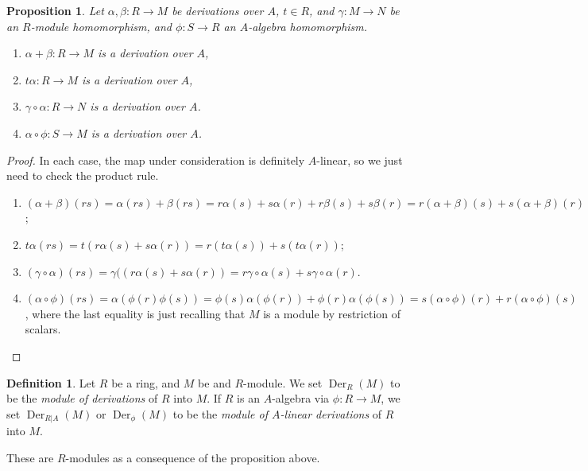 \documentclass{amsart}[12pt]
\def\Der{\operatorname{Der}}
\numberwithin{equation}{section}
\theoremstyle{plain} %
\newtheorem{prop}[equation]{Proposition}
\theoremstyle{definition}
\newtheorem{defn}[equation]{Definition}
\theoremstyle{remark}
\begin{document}
\begin{prop} Let $\alpha,\beta:R\to M$ be derivations over $A$, $t\in R$, and $\gamma:M\to N$ be an $R$-module homomorphism, and $\phi:S\to R$ an $A$-algebra homomorphism.
\begin{enumerate}
\item $\alpha+\beta:R\to M$ is a derivation over $A$,
\item $t\alpha:R\to M$ is a derivation over $A$,
\item $\gamma\circ \alpha:R\to N$ is a derivation over $A$.
\item $\alpha\circ \phi:S\to M$ is a derivation over $A$.
\end{enumerate}
\end{prop}
\begin{proof} In each case, the map under consideration is definitely $A$-linear, so we just need to check the product rule.
\begin{enumerate}
\item $(\alpha+\beta)(rs) =\alpha(rs) + \beta(rs) = r\alpha(s) + s\alpha(r) + r\beta(s)+s\beta(r) =r(\alpha+\beta)(s) + s(\alpha+\beta)(r)$;
\item $t\alpha(rs) = t(r\alpha(s) + s\alpha(r)) = r(t\alpha(s)) + s(t\alpha(r))$;
\item $(\gamma\circ \alpha)(rs)= \gamma((r\alpha(s) + s\alpha(r))= r\gamma\circ\alpha(s) + s\gamma\circ\alpha(r)$.
\item $(\alpha\circ \phi)(rs) = \alpha( \phi(r) \phi(s) ) = \phi(s) \alpha(\phi(r)) + \phi(r) \alpha(\phi(s)) = s (\alpha\circ \phi)(r) + r (\alpha\circ \phi)(s)$, where the last equality is just recalling that $M$ is a module by restriction of scalars.
\qedhere
\end{enumerate}
\end{proof}

\begin{defn} Let $R$ be a ring, and $M$ be and $R$-module. We set $\Der_R(M)$\index{$\Der_R(M)$} to be the \emph{module of derivations} of $R$ into $M$. If $R$ is an $A$-algebra via $\phi:R\to M$, we set $\Der_{R|A}(M)$\index{$\Der_{R|A}(M)$} or $\Der_\phi(M)$\index{$\Der_\phi(M)$} to be the \emph{module of $A$-linear derivations} of $R$ into $M$.
\end{defn}

These are $R$-modules as a consequence of the proposition above.
\end{document}
